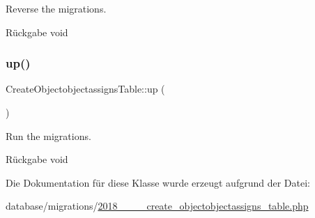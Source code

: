 Reverse the migrations.

\begin{DoxyReturn}{Rückgabe}
void 
\end{DoxyReturn}
\mbox{\label{classCreateObjectobjectassignsTable_a96edf1d650638d9dd293e59e985615f4}} 
\subsubsection{\texorpdfstring{up()}{up()}}
{\footnotesize\ttfamily Create\+Objectobjectassigns\+Table\+::up (\begin{DoxyParamCaption}{ }\end{DoxyParamCaption})}

Run the migrations.

\begin{DoxyReturn}{Rückgabe}
void 
\end{DoxyReturn}


Die Dokumentation für diese Klasse wurde erzeugt aufgrund der Datei\+:\begin{DoxyCompactItemize}
\item 
database/migrations/\hyperlink{2018__06__19__120455__create__objectobjectassigns__table_8php}{2018\+\_\+\_\+\_\+\_\+create\+\_\+objectobjectassigns\+\_\+table.\+php}\end{DoxyCompactItemize}
